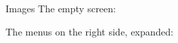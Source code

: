 \documentclass{article}
\begin{document}
\begin{section}{Images}
The empty screen:

\hspace{-1.5cm}

\pagebreak
The menus on the right side, expanded:


\end{section}
\end{document}
